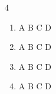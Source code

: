 \documentclass[a4paper,12pt]{article}
\begin{document}
\begin{multicols}{4}
  \large
  \begin{enumerate}[label=]
    \item A \hspace*{0.1mm} B \hspace*{0.1mm} C \hspace*{0.1mm} D
    \item A \hspace*{0.1mm} B \hspace*{0.1mm} C \hspace*{0.1mm} D
    \item A \hspace*{0.1mm} B \hspace*{0.1mm} C \hspace*{0.1mm} D
    \item A \hspace*{0.1mm} B \hspace*{0.1mm} C \hspace*{0.1mm} D
  \end{enumerate}
\end{multicols}
\end{document}
